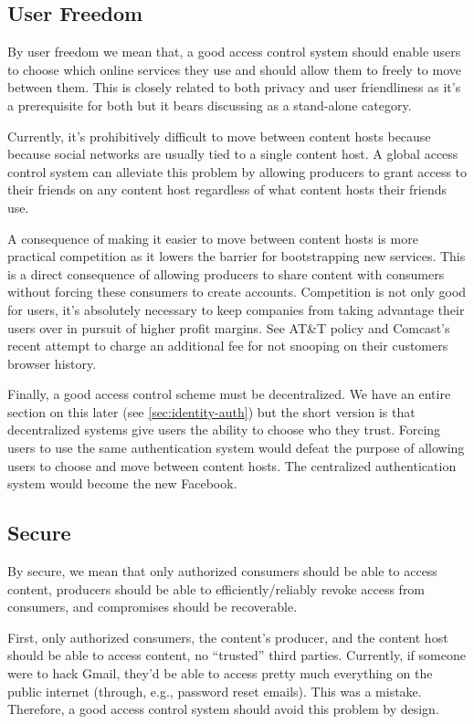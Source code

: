 \documentclass[pdftex,12pt,a4papaer,twoside,notitlepage]{report}
\begin{document}
\subsection{User Freedom}
\label{sub:goal-freedom}

By user freedom we mean that, a good access control system should enable users
to choose which online services they use and should allow them to freely to move
between them. This is closely related to both privacy and user friendliness as
it's a prerequisite for both but it bears discussing as a stand-alone category.

Currently, it's prohibitively difficult to move between content hosts because
because social networks are usually tied to a single content host. A global
access control system can alleviate this problem by allowing producers to grant
access to their friends on any content host regardless of what content hosts
their friends use.

A consequence of making it easier to move between content hosts is more
practical competition as it lowers the barrier for bootstrapping new services.
This is a direct consequence of allowing producers to share content with
consumers without forcing these consumers to create accounts. Competition is not
only good for users, it's absolutely necessary to keep companies from taking
advantage their users over in pursuit of higher profit margins. See
AT\&T\cite{att} policy and Comcast's\cite{comcast} recent attempt to charge an
additional fee for not snooping on their customers browser history.

Finally, a good access control scheme must be decentralized. We have an entire
section on this later (see \cref{sec:identity-auth}) but the short version is
that decentralized systems give users the ability to choose who they trust.
Forcing users to use the same authentication system would defeat the purpose of
allowing users to choose and move between content hosts. The centralized
authentication system would become the new Facebook.

\subsection{Secure}

By secure, we mean that only authorized consumers should be able to access
content, producers should be able to efficiently/reliably revoke access from
consumers, and compromises should be recoverable.

First, only authorized consumers, the content's producer, and the content host
should be able to access content, no ``trusted'' third parties. Currently, if
someone were to hack Gmail, they'd be able to access pretty much everything on
the public internet (through, e.g., password reset emails). This was a mistake.
Therefore, a good access control system should avoid this problem by design.
\end{document}
